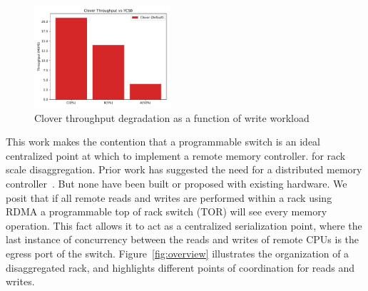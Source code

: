 \begin{figure}
    \includegraphics[width=0.45\textwidth]{fig/clover_tput.pdf}
    \caption{Clover throughput degradation as a function of write
    workload}
    \label{fig:clover_tput}
\end{figure}



This work makes the contention that a programmable switch is an ideal
centralized point at which to implement a remote memory controller.
for rack scale disaggregation. Prior work has suggested the need for
a distributed memory controller~\cite{disandapp}. But none have been
built or proposed with existing hardware. We posit that if all remote
reads and writes are performed within a rack using RDMA a programmable
top of rack switch (TOR) will see every memory operation. This fact
allows it to act as a centralized serialization point, where the last
instance of concurrency between the reads and writes of remote CPUs is
the egress port of the switch. Figure~\ref{fig:overview} illustrates
the organization of a disaggregated rack, and highlights different
points of coordination for reads and writes.



